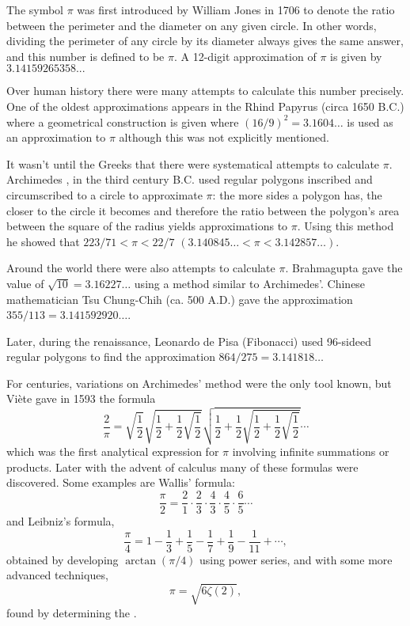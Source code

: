 \documentclass{article}
\newcommand{\medio}{\frac{1}{2}}
\newcommand{\<}{\langle}
\renewcommand{\>}{\rangle}
\begin{document}
The symbol $\pi$ was first introduced by William Jones \cite{higham, jones} in 1706 to denote the ratio between the perimeter and the diameter on any given circle.  In other words, dividing the perimeter of any circle by its diameter always gives the same answer, and this number is defined to be $\pi$.  A 12-digit approximation of $\pi$ is given by $3.14159265358...$

Over human history there were many attempts to calculate this number precisely. One of the oldest approximations appears in the Rhind Papyrus (circa 1650 B.C.) where a geometrical construction is given where $(16/9)^2=3.1604\ldots$ is used as an approximation to $\pi$ although this was not explicitly mentioned. 

It wasn't until the Greeks that there were systematical attempts to calculate $\pi$. Archimedes \cite{Mact}, in the third century B.C. used regular polygons inscribed and circumscribed to a circle to approximate $\pi$: the more sides a polygon has, the closer to the circle it becomes and therefore the ratio between the polygon's area between the square of the radius yields approximations to $\pi$. Using this method he showed that $223/71<\pi<22/7$ $(3.140845\ldots<\pi<3.142857\ldots)$. 

Around the world there were also attempts to calculate $\pi$. 
Brahmagupta \cite{Mact} gave the value of $\sqrt{10}=3.16227\ldots$ using a method similar to Archimedes'. Chinese mathematician Tsu Chung-Chih (ca. 500 A.D.) gave the approximation $355/113=3.141592920\ldots$.

Later, during the renaissance, Leonardo de Pisa (Fibonacci) \cite{Mact} used 96-sideed regular polygons to find the approximation $864/275=3.141818\ldots$

For centuries, variations on Archimedes' method were the only tool known, but  Vi\`ete \cite{Mact} gave in 1593 the formula $$\frac{2}{\pi}=\sqrt{\medio}\sqrt{\medio+\medio\sqrt{\medio}}\sqrt{\medio+\medio\sqrt{\medio+\medio\sqrt{\medio}}}\cdots$$
which was the first analytical expression for $\pi$ involving infinite summations or products. Later with the advent of calculus many of these formulas were discovered. Some examples are 
Wallis' \cite{Mact} formula:
$$\frac{\pi}{2}=\frac{2}{1}\cdot\frac{2}{3}\cdot\frac{4}{3}\cdot\frac{4}{5}\cdot\frac{6}{5}\cdots$$
and Leibniz's formula,
$$\frac{\pi}{4}=1-\frac{1}{3}+\frac{1}{5}-\frac{1}{7}+\frac{1}{9}-\frac{1}{11}+\cdots,$$
obtained by developing $\arctan(\pi/4)$ using power series, and with some more advanced techniques,
$$\pi=\sqrt{6\zeta(2)},$$
found by determining the .
\end{document}
